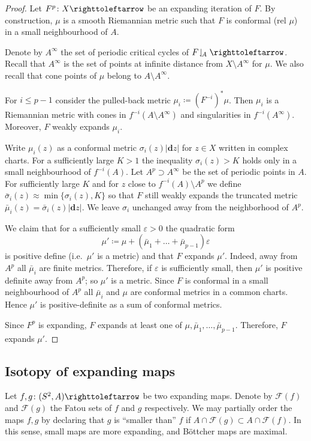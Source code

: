 \documentclass{amsart}
\newcommand\dd{\mathbf{d}}
\newcommand\Fatou{{\mathcal F}}
\begin{document}
\begin{proof}
  Let $F^p\colon X\selfmap $ be an expanding iteration of $F$. By
  construction, $\mu$ is a smooth Riemannian metric such that $F$ is
  conformal (rel $\mu$) in a small neighbourhood of $A$.

  Denote by $A^\infty$ the set of periodic critical cycles of
  $F\restrict A\selfmap$. Recall that $A^\infty$ is the set of points
  at infinite distance from $X\setminus A^\infty$ for $\mu$. We also
  recall that cone points of $\mu$ belong to $A\setminus A^\infty$.

  For $i\le p-1$ consider the pulled-back metric
  $\mu_i\coloneqq (F^{-i})^*\mu$. Then $\mu_i$ is a Riemannian metric
  with cones in $f^{-i}(A\setminus A^\infty)$ and singularities in
  $f^{-i}(A^\infty)$. Moreover, $F$ weakly expands $\mu_i$.

  Write $\mu_i(z)$ as a conformal metric $\sigma_i(z) |\dd z|$ for
  $z\in X$ written in complex charts. For a sufficiently large $K>1$
  the inequality $\sigma_i(z)>K$ holds only in a small neighbourhood of
  $f^{-i} (A)$. Let $A^p\supset A^\infty$ be the set of periodic
  points in $A$. For sufficiently large $K$ and for $z$ close to
  $f^{-i}(A)\setminus A^p$ we define
  $\bar \sigma_i(z)\approx\min\{ \sigma_i(z), K\}$ so that $F$ still
  weakly expands the truncated metric
  $\bar \mu_i(z)= \bar \sigma_i(z) |\dd z|$. We leave $\sigma_i$
  unchanged away from the neighborhood of $A^p$.

  We claim that for a sufficiently small $\varepsilon>0$ the quadratic
  form
  \[\mu'\coloneqq \mu+(\bar\mu_1 +\dots + \bar\mu_{p-1})\varepsilon\]
  is positive define (i.e.~$\mu'$ is a metric) and that $F$ expands
  $\mu'$. Indeed, away from $A^p$ all $\bar \mu_{i}$ are finite
  metrics. Therefore, if $\varepsilon$ is sufficiently small, then
  $\mu'$ is positive definite away from $A^p$; so $\mu'$ is a
  metric. Since $F$ is conformal in a small neighbourhood of $A^p$ all
  $\bar \mu_i$ and $\mu$ are conformal metrics in a common
  charts. Hence $\mu'$ is positive-definite as a sum of conformal
  metrics.

  Since $F^p$ is expanding, $F$ expands at least one of
  $\mu, \bar\mu_1,\dots,\bar\mu_{p-1}$. Therefore, $F$ expands $\mu'$.
 \end{proof}

\subsection{Isotopy of expanding maps}
Let $f,g\colon (S^2,A)\selfmap$ be two expanding maps. Denote by
$\Fatou(f)$ and $\Fatou(g)$ the Fatou sets of $f$ and $g$
respectively. We may partially order the maps $f,g$ by declaring that
$g$ is ``smaller than'' $f$ if $A\cap\Fatou(g)\subset
A\cap\Fatou(f)$. In this sense, small maps are more expanding, and
B\"ottcher maps are maximal.
\end{document}
